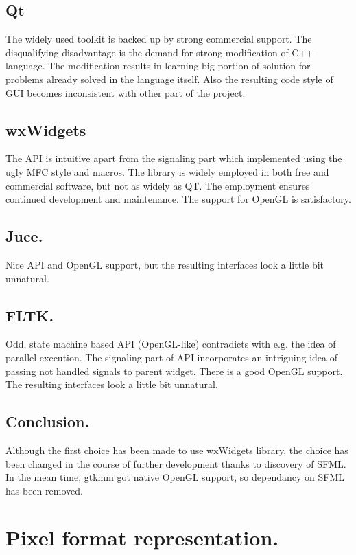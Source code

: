 \subsection{Qt}

The widely used toolkit is backed up by strong commercial support. The disqualifying disadvantage is the demand for strong modification of C++ language. The modification results in learning big portion of solution for problems already solved in the language itself. Also the resulting code style of GUI becomes inconsistent with other part of the project.

\subsection{wxWidgets}

The API is intuitive apart from the signaling part which implemented using the ugly MFC style and macros. The library is widely employed in both free and commercial software, but not as widely as QT. The employment ensures continued development and maintenance. The support for OpenGL is satisfactory.

\subsection{Juce.}
Nice API and OpenGL support, but the resulting interfaces look a little bit unnatural.

\subsection{FLTK.}
Odd, state machine based API (OpenGL-like) contradicts with e.g. the idea of parallel execution. The signaling part of API incorporates an intriguing idea of passing not handled signals to parent widget. There is a good OpenGL support. The resulting interfaces look a little bit unnatural.

\subsection{Conclusion.}
Although the first choice has been made to use wxWidgets library, the choice has been changed in the course of further development thanks to discovery of SFML. In the mean time, gtkmm got native OpenGL support, so dependancy on SFML has been removed.

\section{Pixel format representation.}
\label{section:pixel_format_representation}

